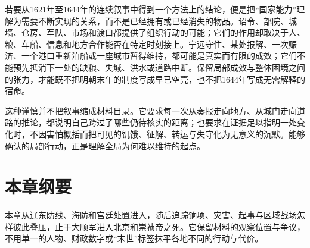 若要从1621年至1644年的连续叙事中得到一个方法上的结论，便是把“国家能力”理解为需要不断实现的关系，而不是已经拥有或已经消失的物品。诏令、部院、城墙、仓房、军队、市场和渡口都提供了组织行动的可能；它们的作用却取决于人、粮、车船、信息和地方合作能否在特定时刻接上。宁远守住、某处报解、一次赈济、一个港口重新泊船或一座城市暂得维持，都可能是真实而有限的成效；它们不能预先抵消下一处的缺粮、失城、洪水或道路中断。保留局部成效与整体困境之间的张力，才能既不把明朝末年的制度写成早已空壳，也不把1644年写成无需解释的宿命。

这种谨慎并不把叙事缩成材料目录。它要求每一次从奏报走向地方、从城门走向道路的推论，都说明自己跨过了哪些仍待核实的距离；也要求在证据足以指明一处变化时，不因害怕概括而把可见的饥饿、征解、转运与失守化为无意义的沉默。能够确认的局部行动，正是理解全局为何难以维持的起点。
\section{本章纲要}

本章从辽东防线、海防和宫廷处置进入，随后追踪饷项、灾害、起事与区域战场怎样彼此叠压，止于大顺军进入北京和崇祯帝之死。它保留材料的观察位置与争议，不用单一的人物、财政数字或“末世”标签抹平各地不同的行动与代价。
